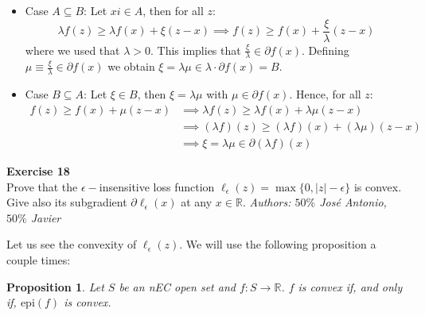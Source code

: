 \documentclass[11pt,table]{article}
\newenvironment{problem}[2][Exercise]
{ \begin{mdframed}[backgroundcolor=gray!20] \textbf{#1 #2} \\}
	{\hspace{0.0cm}\newline\newline \emph{Authors: \(50\%\) José Antonio, \(50\%\) Javier}  \end{mdframed}}
\newtheorem{nprop}{Proposition}
\newcommand\abs[1]{\lvert#1\rvert}
\newcommand\R{\mathbb R}
\begin{document}
	\begin{itemize}
		\item Case $A \subseteq B$: Let $xi \in A$, then for all $z$:
		\[
		\lambda f(z) \ge \lambda f(x) + \xi (z-x) \implies f(z) \ge f(x) + \frac{\xi}{\lambda}(z-x)
		\]
		where we used that $\lambda > 0$. This implies that $\frac{\xi}{\lambda} \in \partial f(x)$. Defining $\mu \equiv \frac{\xi}{\lambda} \in \partial f(x)$ we obtain $\xi = \lambda \mu \in \lambda \cdot \partial f(x) = B$.
		
		\item Case $B \subseteq A$: Let $\xi \in B$, then $\xi = \lambda \mu$ with $\mu \in \partial f(x)$. Hence, for all $z$:
		\begin{align*}
			f(z) \ge f(x) + \mu(z-x) & \implies \lambda f(z) \ge \lambda f(x) + \lambda\mu(z-x)       \\
			& \implies (\lambda f)(z) \ge (\lambda f)(x) + (\lambda\mu)(z-x) \\
			& \implies \xi = \lambda \mu \in \partial(\lambda f)(x)
		\end{align*}
	\end{itemize}
	
	\begin{problem}{18}
		Prove that the \(\epsilon-\)insensitive loss function \(\ell_\epsilon(z) = \max\{0,\abs{z} - \epsilon\}\) is convex. Give also its subgradient \(\partial \ell_\epsilon(x)\) at any \(x \in \R\).
	\end{problem}
	
	
	Let us see the convexity of \(\ell_\epsilon(z)\). We will use the following proposition a couple times:
	\begin{nprop}
		Let \(S\) be an nEC open set and \(f:S\to \R\). \(f\) is convex if, and only if, \(\text{epi}(f)\) is convex.
	\end{nprop}
	
\end{document}
